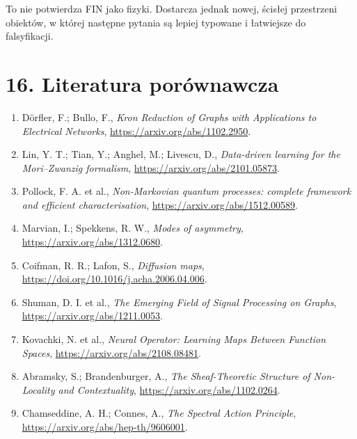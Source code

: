 \documentclass[11pt,a4paper,openany]{report}
\begin{document}
To nie potwierdza FIN jako fizyki. Dostarcza jednak nowej, ścisłej przestrzeni obiektów, w której następne pytania są lepiej typowane i łatwiejsze do falsyfikacji.

\chapter{16. Literatura porównawcza}

\begin{enumerate}
\item 
Dörfler, F.; Bullo, F., \emph{Kron Reduction of Graphs with Applications to Electrical Networks}, \href{https://arxiv.org/abs/1102.2950}{https:/\allowbreak{}/\allowbreak{}arxiv.org/\allowbreak{}abs/\allowbreak{}1102.2950}.

\item 
Lin, Y. T.; Tian, Y.; Anghel, M.; Livescu, D., \emph{Data-driven learning for the Mori--Zwanzig formalism}, \href{https://arxiv.org/abs/2101.05873}{https:/\allowbreak{}/\allowbreak{}arxiv.org/\allowbreak{}abs/\allowbreak{}2101.05873}.

\item 
Pollock, F. A. et al., \emph{Non-Markovian quantum processes: complete framework and efficient characterisation}, \href{https://arxiv.org/abs/1512.00589}{https:/\allowbreak{}/\allowbreak{}arxiv.org/\allowbreak{}abs/\allowbreak{}1512.00589}.

\item 
Marvian, I.; Spekkens, R. W., \emph{Modes of asymmetry}, \href{https://arxiv.org/abs/1312.0680}{https:/\allowbreak{}/\allowbreak{}arxiv.org/\allowbreak{}abs/\allowbreak{}1312.0680}.

\item 
Coifman, R. R.; Lafon, S., \emph{Diffusion maps}, \href{https://doi.org/10.1016/j.acha.2006.04.006}{https:/\allowbreak{}/\allowbreak{}doi.org/\allowbreak{}10.1016/\allowbreak{}j.acha.2006.04.006}.

\item 
Shuman, D. I. et al., \emph{The Emerging Field of Signal Processing on Graphs}, \href{https://arxiv.org/abs/1211.0053}{https:/\allowbreak{}/\allowbreak{}arxiv.org/\allowbreak{}abs/\allowbreak{}1211.0053}.

\item 
Kovachki, N. et al., \emph{Neural Operator: Learning Maps Between Function Spaces}, \href{https://arxiv.org/abs/2108.08481}{https:/\allowbreak{}/\allowbreak{}arxiv.org/\allowbreak{}abs/\allowbreak{}2108.08481}.

\item 
Abramsky, S.; Brandenburger, A., \emph{The Sheaf-Theoretic Structure of Non-Locality and Contextuality}, \href{https://arxiv.org/abs/1102.0264}{https:/\allowbreak{}/\allowbreak{}arxiv.org/\allowbreak{}abs/\allowbreak{}1102.0264}.

\item 
Chamseddine, A. H.; Connes, A., \emph{The Spectral Action Principle}, \href{https://arxiv.org/abs/hep-th/9606001}{https:/\allowbreak{}/\allowbreak{}arxiv.org/\allowbreak{}abs/\allowbreak{}hep-th/\allowbreak{}9606001}.

\end{enumerate}
\end{document}
